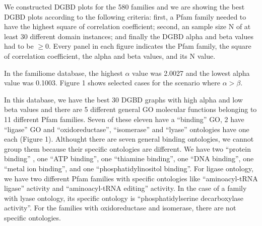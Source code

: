 \documentclass[preprint,12pt]{elsarticle}
\begin{document}
We constructed DGBD plots for the 580  families and we are showing 
the best DGBD plots according to the following criteria: first, 
a Pfam family needed to have the highest square of correlation 
coefficient; second, an sample size N of at least  30 different 
domain instances; and finally the DGBD alpha and beta values had 
to be $\ge 0$. Every panel in each figure indicates the Pfam family, 
the square of correlation coefficient, the alpha and beta values, 
and its N value. \par 

In the familiome database, the highest $\alpha$
value was 2.0027 and the lowest alpha value was 0.1003. Figure 1 
shows selected cases for the scenario where $ \alpha > \beta$.  

In this database, we have the best 30 DGBD graphs with high alpha 
and low beta values and there are 5 different general GO molecular 
functions belonging to 11 different Pfam families. Seven of these 
eleven have a ``binding'' GO, 2 have ``ligase'' GO and 
``oxidoreductase'', ``isomerase'' and ``lyase'' ontologies have 
one each (Figure 1). Althought there are seven general binding 
ontologies, we cannot group them because their specific ontologies 
are different. We have two ``protein binding'' ,  one ``ATP binding'',  
one ``thiamine binding'', one ``DNA binding'', one ``metal ion binding'', 
and one ``phosphatidylinositol binding''. For ligase ontology, we 
have two different Pfam families with specific ontologies like 
``aminoacyl-tRNA ligase'' activity and ``aminoacyl-tRNA editing'' 
activity. In the case of a family with lyase ontology, its specific 
ontology is ``phosphatidylserine decarboxylase activity''. 
For the families with oxidoreductase and isomerase, there are not 
specific ontologies.\par
\end{document}
